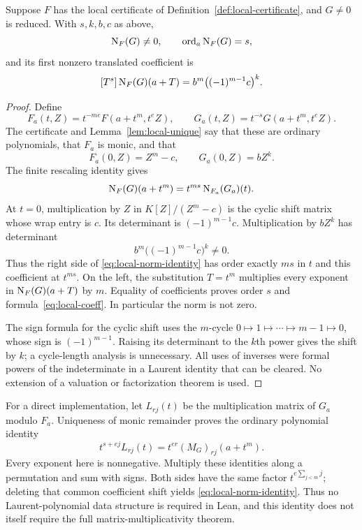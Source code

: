 \begin{theorem}\label{thm:local-norm}
Suppose $F$ has the local certificate of Definition~\ref{def:local-certificate}, and $G\ne0$ is reduced. With $s,k,b,c$ as above,
\[
 \operatorname{N}_F(G)\ne0,\qquad \operatorname{ord}_a\operatorname{N}_F(G)=s,
\]
and its first nonzero translated coefficient is
\begin{equation}\label{eq:local-coeff}
 [T^s]\operatorname{N}_F(G)(a+T)
       =b^m\bigl((-1)^{m-1}c\bigr)^k.
\end{equation}
\end{theorem}
\begin{proof}
Define
\[
 F_a(t,Z)=t^{-me}F(a+t^m,t^eZ),\qquad
 G_a(t,Z)=t^{-s}G(a+t^m,t^eZ).
\]
The certificate and Lemma~\ref{lem:local-unique} say that these are ordinary polynomials, that $F_a$ is monic, and that
\[
 F_a(0,Z)=Z^m-c,\qquad G_a(0,Z)=bZ^k.
\]
The finite rescaling identity gives
\begin{equation}\label{eq:local-norm-identity}
 \operatorname{N}_F(G)(a+t^m)
     =t^{ms}\operatorname{N}_{F_a}(G_a)(t).
\end{equation}
At $t=0$, multiplication by $Z$ in $K[Z]/(Z^m-c)$ is the cyclic shift matrix whose wrap entry is $c$. Its determinant is $(-1)^{m-1}c$. Multiplication by $bZ^k$ has determinant
\[
 b^m\bigl((-1)^{m-1}c\bigr)^k\ne0.
\]
Thus the right side of \eqref{eq:local-norm-identity} has order exactly $ms$ in $t$ and this coefficient at $t^{ms}$. On the left, the substitution $T=t^m$ multiplies every exponent in $\operatorname{N}_F(G)(a+T)$ by $m$. Equality of coefficients proves order $s$ and formula~\eqref{eq:local-coeff}. In particular the norm is not zero.

The sign formula for the cyclic shift uses the $m$-cycle $0\mapsto1\mapsto\cdots\mapsto m-1\mapsto0$, whose sign is $(-1)^{m-1}$. Raising its determinant to the $k$th power gives the shift by $k$; a cycle-length analysis is unnecessary. All uses of inverses were formal powers of the indeterminate in a Laurent identity that can be cleared. No extension of a valuation or factorization theorem is used.
\end{proof}

For a direct implementation, let $L_{rj}(t)$ be the multiplication matrix of $G_a$ modulo $F_a$. Uniqueness of monic remainder proves the ordinary polynomial identity
\[
 t^{s+ej}L_{rj}(t)=t^{er}(M_G)_{rj}(a+t^m).
\]
Every exponent here is nonnegative. Multiply these identities along a permutation and sum with signs. Both sides have the same factor $t^{e\sum_{j<m}j}$; deleting that common coefficient shift yields \eqref{eq:local-norm-identity}. Thus no Laurent-polynomial data structure is required in Lean, and this identity does not itself require the full matrix-multiplicativity theorem.

